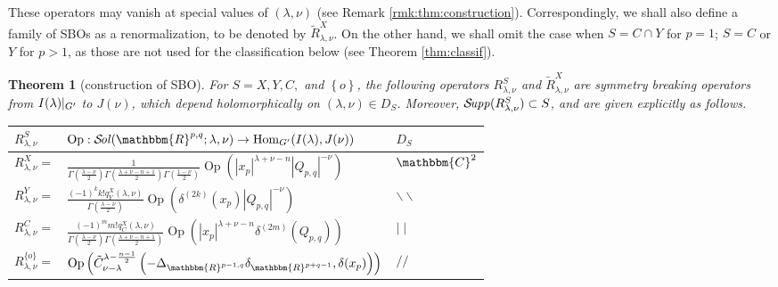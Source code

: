 \documentclass[reqno,12pt]{pja00} %
\newcommand{\tmop}[1]{\ensuremath{\operatorname{#1}}}
\newtheorem{theorem}{Theorem}
\newcommand{\Sol}{\mathcal{S}\!{\it ol}}
\newcommand{\Supp}{\mathcal{S}\!{\it upp}}
\theoremstyle{definition}
\theoremstyle{exampstyle} \newtheorem{examp}[theorem]{Theorem}
\renewcommand{\Q}{Q_{p,q}}
\newcommand{\IlambdaGprime}{I(\lambda)\kern-0.3em\mid_{G'}}
\begin{document}
These operators may vanish at special values of $(\lambda,\nu)$ (see Remark \ref{rmk:thm:construction}). Correspondingly, we shall also define
a family of SBOs as a renormalization, to be denoted by $\tilde{R}^X_{\lambda,\nu}$. On the other hand, we shall omit the case when $S=C\cap Y$ for $p=1$;
$S=C$ or $Y$ for $p>1$, as those are not used for the classification below (see Theorem \ref{thm:classif}).
\newpage
\begin{theorem}[construction of SBO]\label{thm:construction}
	For $S=X,Y,C,$ and $\left\{ o \right\}$, the following operators $R_{\lambda,\nu}^S$ and $\tilde{R}_{\lambda,\nu}^X$ are symmetry breaking operators from $\IlambdaGprime$ to $J(\nu)$, which depend holomorphically on $(\lambda,\nu)\in D_S$. Moreover, $\Supp(R_{\lambda,\nu}^S)\subset S$, and are given explicitly as follows.

\hspace*{-3.5cm}\begin{tabular}[c]{@{}|@{}l@{}|@{}l@{}|l@{}|}
  \hline
  $R_{\lambda,\nu}^S$& $\tmop{Op} : 
  \Sol(\mathbbm{R}^{p, q} ; \lambda, \nu)
  \rightarrow \tmop{Hom}_{G'} (I (\lambda), J (\nu))$ & $D_S\,$ 
  \\
  \hline
  $R_{\lambda, \nu}^X =$ & $ \frac{1}{\Gamma \left( \frac{\lambda - \nu}{2} \right) \Gamma \left(
  \frac{\lambda + \nu - n + 1}{2} \right) \Gamma \left( \frac{1 - \nu}{2}
  \right)}{\tmop{Op} \left(| x_p |^{\lambda + \nu - n}
  | \Q |^{- \nu} \right)}$ & $\mathbbm{C}^2$ \\
  \hline
  $R_{\lambda, \nu}^Y =$ & $\frac{(-1)^k k! q_Y^X (\lambda, \nu)}{\Gamma \left( \frac{\lambda - \nu}{2}
  \right) }{\tmop{Op} \left( \delta^{(2k)}(x_p)
  | \Q |^{- \nu}  \right)}$ & $
  \backslash\backslash$ \\
  \hline
  $R_{\lambda, \nu}^C =$ & $\frac{(-1)^m m! q_C^X (\lambda, \nu)}{\Gamma \left( \frac{\lambda - \nu}{2}
  \right) \Gamma \left( \frac{\lambda + \nu - n + 1}{2} \right) }{\tmop{Op} \left( | x_p |^{\lambda + \nu - n}\delta^{(2m)}\left( \Q \right)
    \right)}$ & $ \mid \mid$ \\
  \hline
  $R_{\lambda, \nu}^{\{ o \}} =$ & 
  $\tmop{Op} \left( \tilde{C}_{\nu -
  \lambda}^{\lambda - \frac{n - 1}{2}} \left(-\Delta_{\mathbbm{R}^{p - 1, q}}
  \delta_{\mathbbm{R}^{p + q - 1}}, \delta (x_p)\right) \right)
  $ & $
  / /$\\
  \hline
\end{tabular}


\end{theorem}
\end{document}
